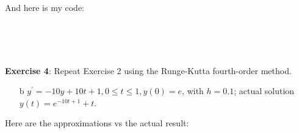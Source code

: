 \documentclass{article}
\begin{document}
\begin{answer}
\begin{center}
        \end{center}
        And here is my code:
        \inputminted{matlab}{./code/Euler.m}
        \inputminted{matlab}{./code/q5f.m}
        \inputminted{matlab}{./code/q5actf.m}
        \inputminted{matlab}{./code/evalActStiff.m}
        \inputminted{matlab}{./code/script6.m}
    \end{answer}

\textbf{Exercise 4}: Repeat Exercise 2 using the Runge-Kutta fourth-order method.
    \begin{itemize}
        \item [b] $y^{\prime} = -10y + 10t + 1, 0 \leq t \leq 1, y(0) = e$, with $h  = 0.1$; actual solution $y(t) = e^{-10t + 1} + t$.
    \end{itemize}
    \begin{answer}
        Here are the approximations vs the actual result:
        \begin{center}

\end{center}
\end{answer}
\end{document}
